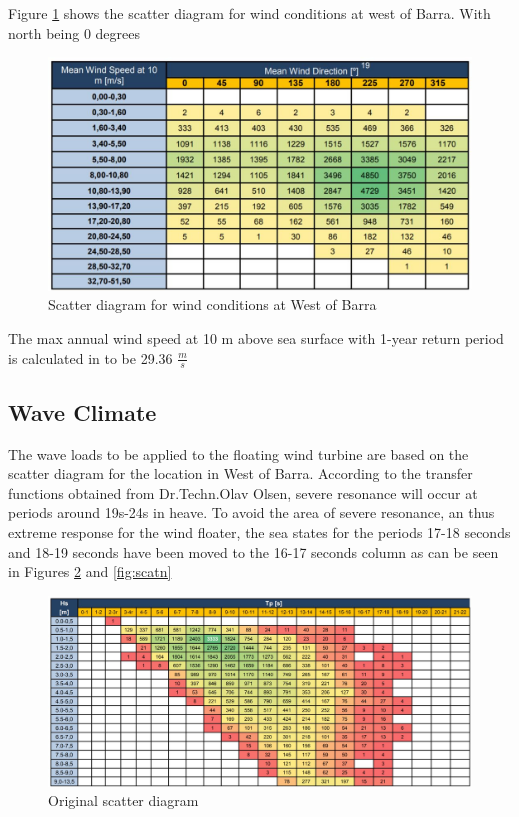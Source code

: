 \noindent Figure \ref{fig:scatterwind} shows the scatter diagram for wind conditions at west of Barra. With north being 0 degrees

\begin{figure}[H]
\centering
\includegraphics[scale=0.7]{figures/scatterwind}
\caption[$\; \:$Scatter diagram for wind conditions]{Scatter diagram for wind conditions at West of Barra \cite{Lifes50+D1.1} }
 \label{fig:scatterwind}
\end{figure}
 
 \noindent The max annual wind speed at 10 m above sea surface with 1-year return period is calculated in \cite{Lifes50+D1.1} to be  29.36 $\frac{m}{s}$



\subsection{Wave Climate}
The wave loads to be applied to the floating wind turbine are based on the scatter diagram for the location in West of Barra. According to the transfer functions obtained from Dr.Techn.Olav Olsen, severe resonance will occur at periods around 19s-24s in heave. To avoid the area of severe resonance, an thus extreme response for the wind floater, the sea states for the periods 17-18 seconds and 18-19 seconds have been moved to the 16-17 seconds column as can be seen in Figures \ref{fig:scato} and \ref{fig:scatn}

\begin{figure}[H]
\centering
\includegraphics[scale=0.5]{figures/scatteroriginal}
\caption[$\; \:$Original scatter diagram]{Original scatter diagram \cite{Lifes50+D1.1} }
 \label{fig:scato}
\end{figure}

